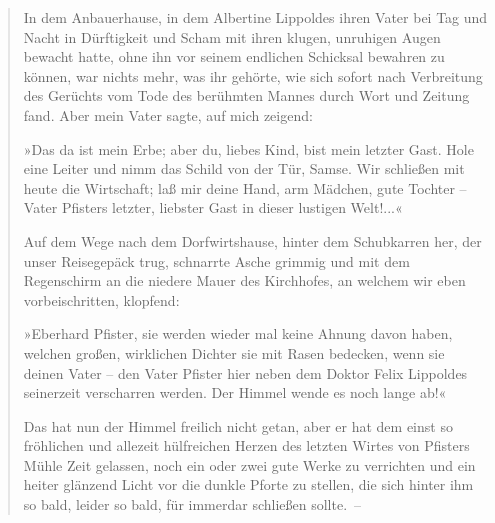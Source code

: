 \begin{verse}
In dem Anbauerhause, in dem Albertine Lippoldes ihren Vater bei Tag
und Nacht in Dürftigkeit und Scham mit ihren klugen, unruhigen
Augen bewacht hatte, ohne ihn vor seinem endlichen Schicksal
bewahren zu können, war nichts mehr, was ihr gehörte, wie sich
sofort nach Verbreitung des Gerüchts vom Tode des berühmten Mannes
durch Wort und Zeitung fand. Aber mein Vater sagte, auf mich
zeigend:

»Das da ist mein Erbe; aber du, liebes Kind, bist mein letzter
Gast. Hole eine Leiter und nimm das Schild von der Tür, Samse. Wir
schließen mit heute die Wirtschaft; laß mir deine Hand, arm
Mädchen, gute Tochter – Vater Pfisters letzter, liebster Gast in
dieser lustigen Welt!...«

Auf dem Wege nach dem Dorfwirtshause, hinter dem Schubkarren her,
der unser Reisegepäck trug, schnarrte Asche grimmig und mit dem
Regenschirm an die niedere Mauer des Kirchhofes, an welchem wir
eben vorbeischritten, klopfend:

»Eberhard Pfister, sie werden wieder mal keine Ahnung davon haben,
welchen großen, wirklichen Dichter sie mit Rasen bedecken, wenn sie
deinen Vater – den Vater Pfister hier neben dem Doktor Felix
Lippoldes seinerzeit verscharren werden. Der Himmel wende es noch
lange ab!«

Das hat nun der Himmel freilich nicht getan, aber er hat dem einst
so fröhlichen und allezeit hülfreichen Herzen des letzten Wirtes
von Pfisters Mühle Zeit gelassen, noch ein oder zwei gute Werke zu
verrichten und ein heiter glänzend Licht vor die dunkle Pforte zu
stellen, die sich hinter ihm so bald, leider so bald, für immerdar
schließen sollte.~–


\end{verse}
